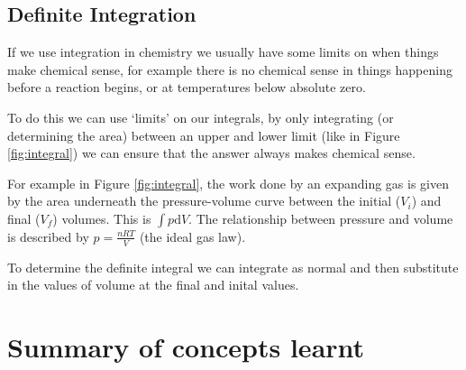 \documentclass[
]{book}
\begin{document}
\hypertarget{subsec:defint}{%
\subsection{Definite Integration}\label{subsec:defint}}

If we use integration in chemistry we usually have some limits on when things make chemical sense, for example there is no chemical sense in things happening before a reaction begins, or at temperatures below absolute zero.

To do this we can use `limits' on our integrals, by only integrating (or determining the area) between an upper and lower limit (like in Figure \ref{fig:integral}) we can ensure that the answer always makes chemical sense.

For example in Figure \ref{fig:integral}, the work done by an expanding gas is given by the area underneath the pressure-volume curve between the initial (\(V_i\)) and final (\(V_f\)) volumes. This is \(\int p \textrm{d}V\). The relationship between pressure and volume is described by \(p=\tfrac{nRT}{V}\) (the ideal gas law).

To determine the definite integral we can integrate as normal and then substitute in the values of volume at the final and inital values.

\hypertarget{summary-of-concepts-learnt-2}{%
\section{Summary of concepts learnt}\label{summary-of-concepts-learnt-2}}
\end{document}
